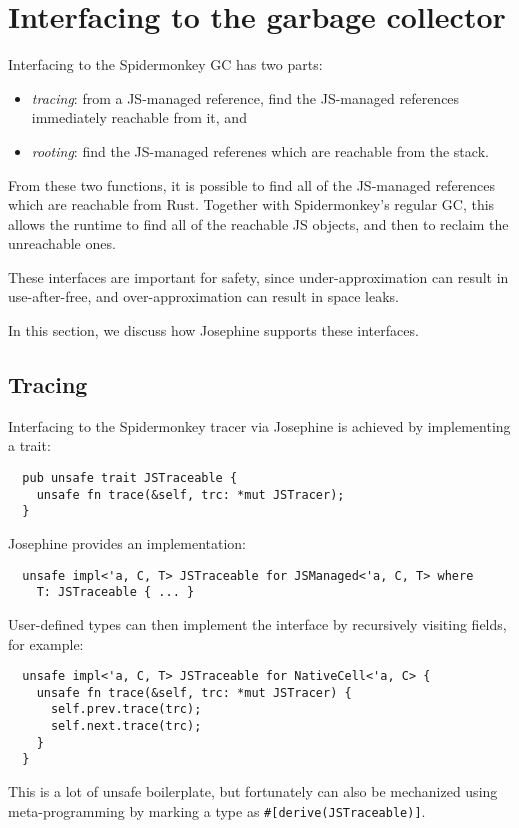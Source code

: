 \section{Interfacing to the garbage collector}

Interfacing to the Spidermonkey GC has two parts:
\begin{itemize}

\item \emph{tracing}: from a JS-managed reference, find
  the JS-managed references immediately reachable from it, and

\item \emph{rooting}: find the JS-managed referenes which
  are reachable from the stack.

\end{itemize}
From these two functions, it is possible to find all of the
JS-managed references which are reachable from Rust. Together
with Spidermonkey's regular GC, this allows the runtime to
find all of the reachable JS objects, and then to reclaim the
unreachable ones.

These interfaces are important for safety, since
under-approximation can result in use-after-free,
and over-approximation can result in space leaks.

In this section, we discuss how Josephine supports these interfaces.

\subsection{Tracing}

Interfacing to the Spidermonkey tracer via Josephine is achieved
by implementing a trait:
\begin{verbatim}
  pub unsafe trait JSTraceable {
    unsafe fn trace(&self, trc: *mut JSTracer);
  }
\end{verbatim}
Josephine provides an implementation:
\begin{verbatim}
  unsafe impl<'a, C, T> JSTraceable for JSManaged<'a, C, T> where
    T: JSTraceable { ... }
\end{verbatim}
User-defined types can then implement the interface by
recursively visiting fields, for example:
\begin{verbatim}
  unsafe impl<'a, C, T> JSTraceable for NativeCell<'a, C> {
    unsafe fn trace(&self, trc: *mut JSTracer) {
      self.prev.trace(trc);
      self.next.trace(trc);
    }
  }
\end{verbatim}
This is a lot of unsafe boilerplate, but fortunately can
also be mechanized using meta-programming by marking a type
as \verb|#[derive(JSTraceable)]|.

